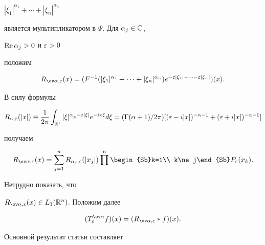 $|\xi_1|^{\alpha_1}+\dotsb+|\xi_n|^{\alpha_n}$


является мультипликатором в $\Psi$. Для $\alpha_j\in\Bbb C$,


$\operatorname{Re}\alpha_j>0$ и $\varepsilon>0$


положим


$$


R_{\ov\alpha,\varepsilon}(x)=(F^{-1}(


|\xi_1|^{\alpha_1}+\dotsb+|\xi_n|^{\alpha_n})


e^{-\varepsilon|\xi_1|-\dotsb-\varepsilon|\xi_n|})(x).


$$


В силу формулы


$$


R_{\alpha,\varepsilon}(|x|)\equiv\frac{1}{2\pi}


\int_{\Bbb R^1}|\xi|^\alpha e^{-\varepsilon|\xi|}


e^{-ix\xi}d\xi=(\Gamma(\alpha+1)/2\pi)


[(\varepsilon-i|x|)^{-\alpha-1}+(\varepsilon+i|x|


)^{-\alpha-1}]


$$


получаем


\begin{equation}


R_{\ov\alpha,\varepsilon}(x)=\sum^n_{j=1}


R_{\alpha_j,\varepsilon}(|x_j|)


\prod^n\begin{Sb}k=1\\ k\ne j\end{Sb}P_\varepsilon(x_k).


\end{equation}


Нетрудно показать, что


$R_{\ov\alpha,\varepsilon}(x)\in L_1(\Bbb R^n)$. Положим далее


\begin{equation}


(T^{\ov\alpha}_\varepsilon f)(x)=


(R_{\ov\alpha,\varepsilon}\ast f)(x).


\end{equation}





Основной результат статьи составляет





